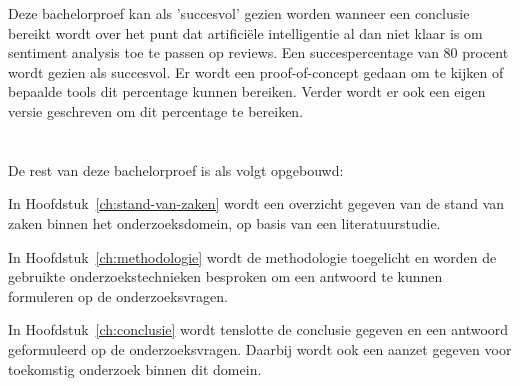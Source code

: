 Deze bachelorproef kan als 'succesvol' gezien worden wanneer een conclusie bereikt wordt over het punt dat artificiële intelligentie al dan niet klaar is om sentiment analysis toe te passen op reviews. Een succespercentage van 80 procent wordt gezien als succesvol. Er wordt een proof-of-concept gedaan om te kijken of bepaalde tools dit percentage kunnen bereiken. Verder wordt er ook een eigen versie geschreven om dit percentage te bereiken.

\section{}
\label{sec:opzet-bachelorproef}


De rest van deze bachelorproef is als volgt opgebouwd:

In Hoofdstuk~\ref{ch:stand-van-zaken} wordt een overzicht gegeven van de stand van zaken binnen het onderzoeksdomein, op basis van een literatuurstudie.

In Hoofdstuk~\ref{ch:methodologie} wordt de methodologie toegelicht en worden de gebruikte onderzoekstechnieken besproken om een antwoord te kunnen formuleren op de onderzoeksvragen.


In Hoofdstuk~\ref{ch:conclusie} wordt tenslotte de conclusie gegeven en een antwoord geformuleerd op de onderzoeksvragen. Daarbij wordt ook een aanzet gegeven voor toekomstig onderzoek binnen dit domein.
